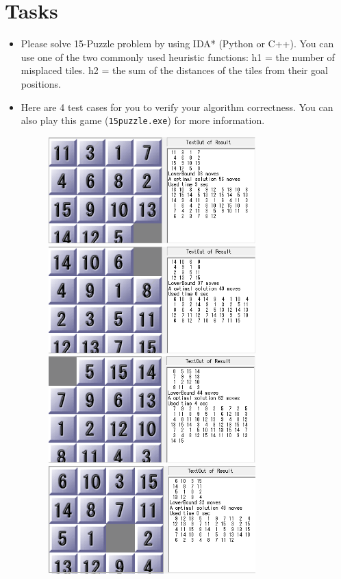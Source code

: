 \documentclass[a4paper, 11pt]{article}
\begin{document}
\section{Tasks}



\begin{itemize}
	\item Please solve 15-Puzzle problem by using IDA* (Python or C++). You can use one of the two commonly used heuristic functions: h1 = the number of misplaced tiles. h2 = the sum of the distances of the tiles from their goal positions. 
	\item Here are 4 test cases for you to verify your algorithm correctness. You can also play this game (\texttt{15puzzle.exe}) for more information.
	\begin{figure}[ht]
	\centering
	\includegraphics[width=8cm]{Pic/case1}
	\quad
	\includegraphics[width=8cm]{Pic/case2}
	\\
	\includegraphics[width=8cm]{Pic/case3}
	\quad
	\includegraphics[width=8cm]{Pic/case4}
	

\end{figure}
\end{itemize}
\end{document}
